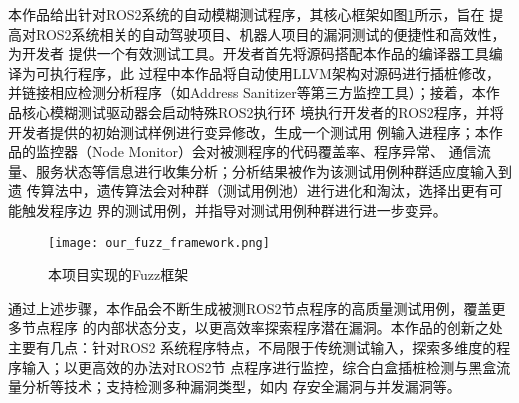 本作品给出针对ROS2系统的自动模糊测试程序，其核心框架如图\ref{pic:off}所示，旨在
提高对ROS2系统相关的自动驾驶项目、机器人项目的漏洞测试的便捷性和高效性，为开发者
提供一个有效测试工具。开发者首先将源码搭配本作品的编译器工具编译为可执行程序，此
过程中本作品将自动使用LLVM架构对源码进行插桩修改，并链接相应检测分析程序（如Address
Sanitizer等第三方监控工具）；接着，本作品核心模糊测试驱动器会启动特殊ROS2执行环
境执行开发者的ROS2程序，并将开发者提供的初始测试样例进行变异修改，生成一个测试用
例输入进程序；本作品的监控器（Node Monitor）会对被测程序的代码覆盖率、程序异常、
通信流量、服务状态等信息进行收集分析；分析结果被作为该测试用例种群适应度输入到遗
传算法中，遗传算法会对种群（测试用例池）进行进化和淘汰，选择出更有可能触发程序边
界的测试用例，并指导对测试用例种群进行进一步变异。

\begin{figure}[H]
    \centering
    \texttt{[image: our\_fuzz\_framework.png]}
    \caption{本项目实现的Fuzz框架}
    \label{pic:off}
\end{figure}

通过上述步骤，本作品会不断生成被测ROS2节点程序的高质量测试用例，覆盖更多节点程序
的内部状态分支，以更高效率探索程序潜在漏洞。本作品的创新之处主要有几点：针对ROS2
系统程序特点，不局限于传统测试输入，探索多维度的程序输入；以更高效的办法对ROS2节
点程序进行监控，综合白盒插桩检测与黑盒流量分析等技术；支持检测多种漏洞类型，如内
存安全漏洞与并发漏洞等。

